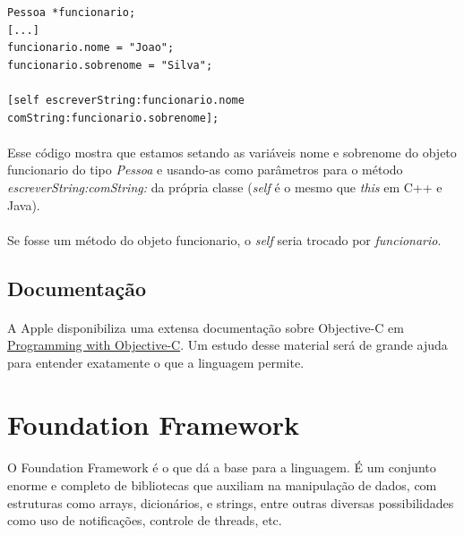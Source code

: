 \documentclass[a4paper,12pt,brazil,doubleside]{book}
\begin{document}
\begin{lstlisting}
Pessoa *funcionario;
[...]
funcionario.nome = "Joao";
funcionario.sobrenome = "Silva";

[self escreverString:funcionario.nome comString:funcionario.sobrenome];
\end{lstlisting}

\bigskip

\paragraph{}Esse código mostra que estamos setando as variáveis nome e sobrenome do objeto funcionario do tipo \emph{Pessoa} e usando-as como parâmetros para o método \emph{escreverString:comString:} da própria classe (\textit{self} é o mesmo que \textit{this} em C++ e Java).
\paragraph{}Se fosse um método do objeto funcionario, o \textit{self} seria trocado por \emph{funcionario}.

\bigskip

\subsection{Documentação}

\paragraph{}A Apple disponibiliza uma extensa documentação sobre Objective-C em \href{https://developer.apple.com/library/ios/#documentation/Cocoa/Conceptual/ProgrammingWithObjectiveC/Introduction/Introduction.html}{Programming with Objective-C}. Um estudo desse material será de grande ajuda para entender exatamente o que a linguagem permite.

\bigskip
\bigskip


\section{Foundation Framework}

\paragraph{}O Foundation Framework é o que dá a base para a linguagem. É um conjunto enorme e completo de bibliotecas que auxiliam na manipulação de dados, com estruturas como arrays, dicionários, e strings, entre outras diversas possibilidades como uso de notificações, controle de threads, etc.
\end{document}
